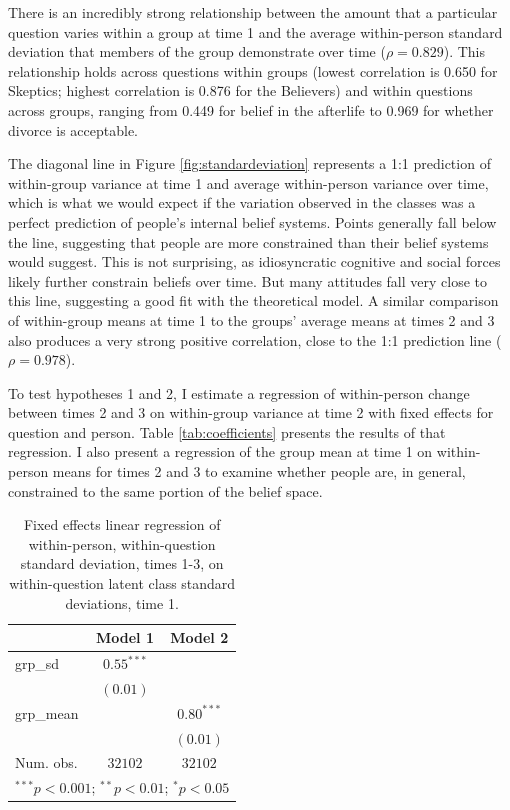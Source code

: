 \documentclass[12pt,]{article}
\begin{document}
There is an incredibly strong relationship between the amount that a particular question varies within a group at time 1 and the average within-person standard deviation that members of the group demonstrate over time (\(\rho = 0.829\)). This relationship holds across questions within groups (lowest correlation is 0.650 for Skeptics; highest correlation is 0.876 for the Believers) and within questions across groups, ranging from 0.449 for belief in the afterlife to 0.969 for whether divorce is acceptable.

The diagonal line in Figure \ref{fig:standardeviation} represents a 1:1 prediction of within-group variance at time 1 and average within-person variance over time, which is what we would expect if the variation observed in the classes was a perfect prediction of people's internal belief systems. Points generally fall below the line, suggesting that people are more constrained than their belief systems would suggest. This is not surprising, as idiosyncratic cognitive and social forces likely further constrain beliefs over time. But many attitudes fall very close to this line, suggesting a good fit with the theoretical model. A similar comparison of within-group means at time 1 to the groups' average means at times 2 and 3 also produces a very strong positive correlation, close to the 1:1 prediction line (\(\rho = 0.978\)).

To test hypotheses 1 and 2, I estimate a regression of within-person change between times 2 and 3 on within-group variance at time 2 with fixed effects for question and person. Table \ref{tab:coefficients} presents the results of that regression. I also present a regression of the group mean at time 1 on within-person means for times 2 and 3 to examine whether people are, in general, constrained to the same portion of the belief space.

\begin{table}
\begin{center}
\begin{tabular}{l c c}
\hline
 & Model 1 & Model 2 \\
\hline
grp\_sd    & $0.55^{***}$ &              \\
           & $(0.01)$     &              \\
grp\_mean  &              & $0.80^{***}$ \\
           &              & $(0.01)$     \\
\hline
Num. obs.  & $32102$      & $32102$      \\
\hline
\multicolumn{3}{l}{\scriptsize{$^{***}p<0.001$; $^{**}p<0.01$; $^{*}p<0.05$}}
\end{tabular}
\caption{Fixed effects linear regression of within-person, within-question standard deviation, times 1-3, on within-question latent class standard deviations, time 1.}
\label{table:femodels}
\end{center}
\end{table}
\end{document}
